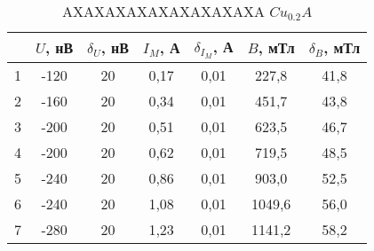 \begin{table}
\centering
\caption{AXAXAXAXAXAXAXAXAXA $Cu_0.2A$}
\begin{tabular}{|c|c|c|c|c|c|c|}
\hline
 & $U$, нВ & $\delta_U$, нВ & $I_M$, А & $\delta_{I_M}$, А & $B$, мТл & $\delta_B$, мТл \\
\hline
1 & -120 & 20 & 0,17 & 0,01 & 227,8 & 41,8 \\
\cline{1-7}
2 & -160 & 20 & 0,34 & 0,01 & 451,7 & 43,8 \\
\cline{1-7}
3 & -200 & 20 & 0,51 & 0,01 & 623,5 & 46,7 \\
\cline{1-7}
4 & -200 & 20 & 0,62 & 0,01 & 719,5 & 48,5 \\
\cline{1-7}
5 & -240 & 20 & 0,86 & 0,01 & 903,0 & 52,5 \\
\cline{1-7}
6 & -240 & 20 & 1,08 & 0,01 & 1049,6 & 56,0 \\
\cline{1-7}
7 & -280 & 20 & 1,23 & 0,01 & 1141,2 & 58,2 \\
\cline{1-7}
\hline
\end{tabular}
\end{table}
